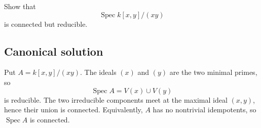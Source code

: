 
\begin{exercise}
	Show that
	\[
	\operatorname{Spec} k[x,y]/(xy)
	\]
	is connected but reducible.
\end{exercise}

\subsection*{Canonical solution}
Put $A=k[x,y]/(xy)$. The ideals $(x)$ and $(y)$ are the two minimal primes, so
\[
\operatorname{Spec} A=V(x)\cup V(y)
\]
is reducible. The two irreducible components meet at the maximal ideal $(x,y)$, hence their union is connected. Equivalently, $A$ has no nontrivial idempotents, so $\operatorname{Spec} A$ is connected.
